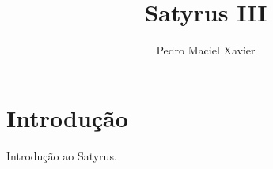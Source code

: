\documentclass{sat}
\title{Satyrus III}
\author{Pedro Maciel Xavier}
\begin{document}
    \maketitle

    \tableofcontents

    \chapter{Introdução}
    Introdução ao Satyrus.
\end{document}
